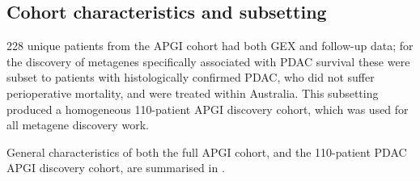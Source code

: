 \documentclass[dissertation.tex]{subfiles}
\begin{document}
\subsection{Cohort characteristics and subsetting}
228 unique patients from the \gls{APGI} cohort had both \gls{GEX} and follow-up data; for the discovery of metagenes specifically associated with \gls{PDAC} survival these were subset to patients with histologically confirmed \gls{PDAC}, who did not suffer perioperative mortality, and were treated within Australia.  This subsetting produced a homogeneous 110-patient \gls{APGI} discovery cohort, which was used for all metagene discovery work.

General characteristics of both the full \gls{APGI} cohort, and the 110-patient \gls{PDAC} \gls{APGI} discovery cohort, are summarised in .
\end{document}
